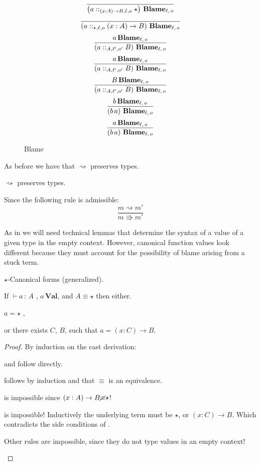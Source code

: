 \begin{figure}
\[
\frac{\,}{\left(a::_{\left(x:A\right)\rightarrow B,\ell ,o}\star\right)\,\textbf{Blame}{}_{\ell,\,o}}
\]
\[
\frac{\,}{\left(a::_{\star,\ell ,o}\left(x:A\right)\rightarrow B\right)\,\textbf{Blame}{}_{\ell,\,o}}
\]
\[
\frac{
 a\,\textbf{Blame}{}_{\ell,\,o}
}{
 \left(a::_{A,\ell',o'}B\right)\,\textbf{Blame}{}_{\ell,\,o}
}
\]
\[
\frac{
 a\,\textbf{Blame}{}_{\ell,\,o}
}{
 \left(a::_{A,\ell',o'}B\right)\,\textbf{Blame}{}_{\ell,\,o}
}
\]
\[
\frac{
 B\,\textbf{Blame}{}_{\ell,\,o}
}{
 \left(a::_{A,\ell',o'}B\right)\,\textbf{Blame}{}_{\ell,\,o}
}
\]
\[
\frac{
 b\,\textbf{Blame}{}_{\ell,\,o}
}{
 \left(b\,a\right)\,\textbf{Blame}{}_{\ell,\,o}
}
\]
\[
\frac{
 a\,\textbf{Blame}{}_{\ell,\,o}
}{
 \left(b\,a\right)\,\textbf{Blame}{}_{\ell,\,o}
}
\]
\caption{\CLang{} Blame}
\label{fig:cast-blame}
\end{figure}
 
As before we have that $\rightsquigarrow$ preserves types.
 
\begin{fact} $\rightsquigarrow$ preserves types.
 
Since the following rule is admissible:
\[
\frac{m\rightsquigarrow m'}{m\Rrightarrow m'}
\]
\end{fact}
 
As in  we will need technical lemmas that determine the syntax of a value of a given type in the empty context.
However, canonical function values look different because they must account for the possibility of blame arising from a stuck term.

\begin{lem} $\star$-Canonical forms (generalized).
 
If $\vdash a\,:\,A$ , $a\,\textbf{Val}$, and $A\equiv\star$ then either.

\textup{$a=\star$ ,}

\textup{or there exists $C$, $B$, such that $a=\left(x:C\right)\rightarrow B$.}
\end{lem}
\begin{proof}
By induction on the cast derivation:
\begin{casenv}
 \item {} and  follow directly.
 \item {} follows by induction and that $\equiv$ is an equivalence.
 \item {} is impossible since $\left(x:A\right)\rightarrow B\cancel{\equiv}\star$!
 \item {} is impossible!
   Inductively the underlying term must be $\star$, or $\left(x:C\right)\rightarrow B$.
   Which contradicts the side conditions of .
 \item Other rules are impossible, since they do not type values in an empty context!
\end{casenv}
\end{proof}

